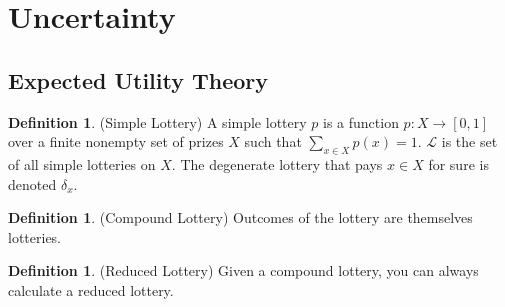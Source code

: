 \documentclass[12pt]{article}
\theoremstyle{plain}
\theoremstyle{definition}
\newtheorem{defn}[thm]{Definition}
\theoremstyle{remark}
\newcommand{\ra}{\rightarrow}
\newcommand{\calL}{\mathcal{L}}
\begin{document}
\clearpage
\section{Uncertainty}


\subsection{Expected Utility Theory}

\begin{defn}(Simple Lottery)
A simple lottery $p$ is a function $p: X\ra [0,1]$ over a finite
nonempty set of prizes $X$ such that $\sum_{x\in X}p(x)=1$.
$\calL$ is the set of all simple lotteries on $X$.
The degenerate lottery that pays $x\in X$ for sure is denoted
$\delta_x$.
\end{defn}

\begin{defn}(Compound Lottery)
Outcomes of the lottery are themselves lotteries.
\end{defn}

\begin{defn}(Reduced Lottery)
Given a compound lottery, you can always calculate a reduced lottery.
\end{defn}
\end{document}
